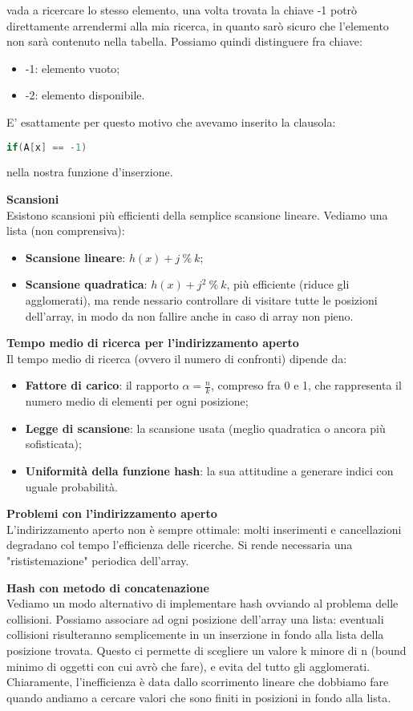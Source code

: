 \documentclass[a4paper,12pt]{article}
\begin{document}
vada a ricercare lo stesso elemento, una volta trovata la chiave -1 potrò direttamente arrendermi alla mia ricerca, in quanto sarò sicuro che l'elemento non sarà contenuto nella tabella. Possiamo quindi
distinguere fra chiave:
\begin{itemize}
  \item -1: elemento vuoto;
  \item -2: elemento disponibile.
\end{itemize}
E' esattamente per questo motivo che avevamo inserito la clausola:
\begin{lstlisting}[language=C++]
if(A[x] == -1)
\end{lstlisting}
nella nostra funzione d'inserzione.
\par\smallskip
\textbf{Scansioni} \\
Esistono scansioni più efficienti della semplice scansione lineare. Vediamo una lista (non comprensiva):
\begin{itemize}
  \item \textbf{Scansione lineare}: $h(x) + j \ \% \ k$;
  \item \textbf{Scansione quadratica}: $h(x) + j^2 \ \% \ k$, più efficiente (riduce gli agglomerati), ma rende nessario controllare
    di visitare tutte le posizioni dell'array, in modo da non fallire anche in caso di array non pieno.
\end{itemize}
\par\smallskip
\textbf{Tempo medio di ricerca per l'indirizzamento aperto} \\
Il tempo medio di ricerca (ovvero il numero di confronti) dipende da:
\begin{itemize}
  \item \textbf{Fattore di carico}: il rapporto $\alpha = \frac{n}{k}$, compreso fra 0 e 1, che rappresenta il numero medio
    di elementi per ogni posizione;
  \item \textbf{Legge di scansione}: la scansione usata (meglio quadratica o ancora più sofisticata);
  \item \textbf{Uniformità della funzione hash}: la sua attitudine a generare indici con uguale probabilità.
\end{itemize}
\par\smallskip
\textbf{Problemi con l'indirizzamento aperto} \\
L'indirizzamento aperto non è sempre ottimale: molti inserimenti e cancellazioni degradano col tempo l'efficienza delle ricerche. Si rende necessaria
una "rististemazione" periodica dell'array.
\par\smallskip
\textbf{Hash con metodo di concatenazione} \\
Vediamo un modo alternativo di implementare hash ovviando al problema delle collisioni. Possiamo associare ad ogni posizione dell'array una lista:
eventuali collisioni risulteranno semplicemente in un inserzione in fondo alla lista della posizione trovata. Questo ci permette di scegliere un valore
k minore di n (bound minimo di oggetti con cui avrò che fare), e evita del tutto gli agglomerati. Chiaramente, l'inefficienza è data dallo scorrimento
lineare che dobbiamo fare quando andiamo a cercare valori che sono finiti in posizioni in fondo alla lista.
\end{document}
